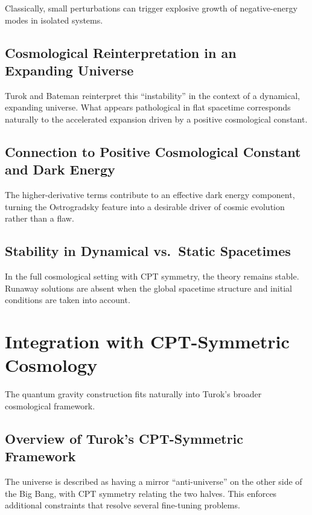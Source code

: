 \documentclass{article}
\begin{document}
Classically, small perturbations can trigger explosive growth of negative-energy modes in isolated systems.

\subsection{Cosmological Reinterpretation in an Expanding Universe}

Turok and Bateman reinterpret this ``instability'' in the context of a dynamical, expanding universe. What appears pathological in flat spacetime corresponds naturally to the accelerated expansion driven by a positive cosmological constant.

\subsection{Connection to Positive Cosmological Constant and Dark Energy}

The higher-derivative terms contribute to an effective dark energy component, turning the Ostrogradsky feature into a desirable driver of cosmic evolution rather than a flaw.

\subsection{Stability in Dynamical vs.\ Static Spacetimes}

In the full cosmological setting with CPT symmetry, the theory remains stable. Runaway solutions are absent when the global spacetime structure and initial conditions are taken into account.

\section{Integration with CPT-Symmetric Cosmology}
\label{sec:cpt}

The quantum gravity construction fits naturally into Turok's broader cosmological framework.

\subsection{Overview of Turok's CPT-Symmetric Framework}

The universe is described as having a mirror ``anti-universe'' on the other side of the Big Bang, with CPT symmetry relating the two halves. This enforces additional constraints that resolve several fine-tuning problems.
\end{document}
